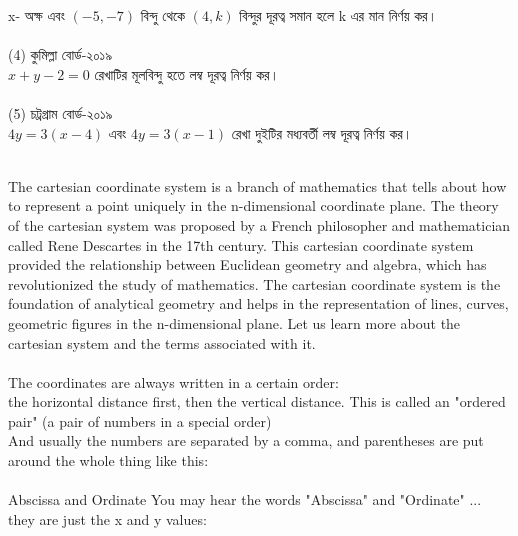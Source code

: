 \documentclass{article}
\begin{document}
x-  অক্ষ এবং $(-5,-7)$  বিন্দু থেকে $(4,k)$ বিন্দুর দূরত্ব সমান হলে k  এর মান নির্ণয় কর।\\
\\
(4) কুমিল্লা বোর্ড-২০১৯\\
$x+y-2=0$ রেখাটির মূলবিন্দু হতে লম্ব দূরত্ব নির্ণয় কর।\\
\\
(5) চট্রগ্রাম বোর্ড-২০১৯\\
$4y=3(x-4)$ এবং $4y=3(x-1)$ রেখা দুইটির মধ্যবর্তী লম্ব দূরত্ব নির্ণয় কর।   
\\
\\ 
The cartesian coordinate system is a branch of mathematics that tells about how to represent a point uniquely in the n-dimensional coordinate plane. The theory of the cartesian system was proposed by a French philosopher and mathematician called Rene Descartes in the 17th century. This cartesian coordinate system provided the relationship between Euclidean geometry and algebra, which has revolutionized the study of mathematics. The cartesian coordinate system is the foundation of analytical geometry and helps in the representation of lines, curves, geometric figures in the n-dimensional plane. Let us learn more about the cartesian system and the terms associated with it.\\
\\
The coordinates are always written in a certain order:
\\
the horizontal distance first,
then the vertical distance.
This is called an "ordered pair" (a pair of numbers in a special order)
\\
And usually the numbers are separated by a comma, and parentheses are put around the whole thing like this:\\
\\
Abscissa and Ordinate
You may hear the words "Abscissa" and "Ordinate" ... they are just the x and y values:
\\
\end{document}

